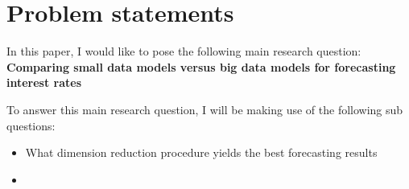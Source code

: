 \section{Problem statements}
In this paper, I would like to pose the following main research question:
\textbf{Comparing small data models versus big data models for forecasting interest rates}

To answer this main research question, I will be making use of the following sub questions:
\begin{itemize}
	\item What dimension reduction procedure yields the best forecasting results
	\item 
\end{itemize}